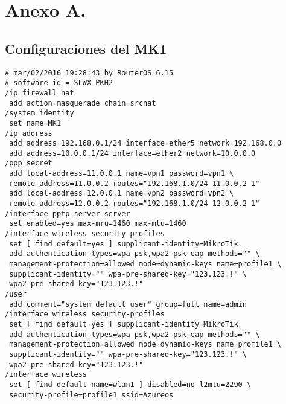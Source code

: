 \fancyhead{}
\fancyfoot{}



\chapter{Anexo A.}

\section{Configuraciones del MK1}
\begin{verbatim}
# mar/02/2016 19:28:43 by RouterOS 6.15
# software id = SLWX-PKH2
/ip firewall nat
 add action=masquerade chain=srcnat
/system identity
 set name=MK1
/ip address
 add address=192.168.0.1/24 interface=ether5 network=192.168.0.0
 add address=10.0.0.1/24 interface=ether2 network=10.0.0.0
/ppp secret
 add local-address=11.0.0.1 name=vpn1 password=vpn1 \
 remote-address=11.0.0.2 routes="192.168.1.0/24 11.0.0.2 1"
 add local-address=12.0.0.1 name=vpn2 password=vpn2 \
 remote-address=12.0.0.2 routes="192.168.1.0/24 12.0.0.2 1"
/interface pptp-server server
 set enabled=yes max-mru=1460 max-mtu=1460
/interface wireless security-profiles
 set [ find default=yes ] supplicant-identity=MikroTik
 add authentication-types=wpa-psk,wpa2-psk eap-methods="" \
 management-protection=allowed mode=dynamic-keys name=profile1 \
 supplicant-identity="" wpa-pre-shared-key="123.123.!" \
 wpa2-pre-shared-key="123.123.!"
/user
 add comment="system default user" group=full name=admin
/interface wireless security-profiles
 set [ find default=yes ] supplicant-identity=MikroTik
 add authentication-types=wpa-psk,wpa2-psk eap-methods="" \
 management-protection=allowed mode=dynamic-keys name=profile1 \
 supplicant-identity="" wpa-pre-shared-key="123.123.!" \
 wpa2-pre-shared-key="123.123.!"
/interface wireless
 set [ find default-name=wlan1 ] disabled=no l2mtu=2290 \
 security-profile=profile1 ssid=Azureos
\end{verbatim}
